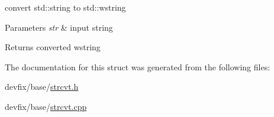 convert std\+::string to std\+::wstring 


\begin{DoxyParams}{Parameters}
{\em str} & input string \\
\hline
\end{DoxyParams}
\begin{DoxyReturn}{Returns}
converted wstring 
\end{DoxyReturn}


The documentation for this struct was generated from the following files\+:\begin{DoxyCompactItemize}
\item 
devfix/base/\hyperlink{strcvt_8h}{strcvt.\+h}\item 
devfix/base/\hyperlink{strcvt_8cpp}{strcvt.\+cpp}\end{DoxyCompactItemize}

